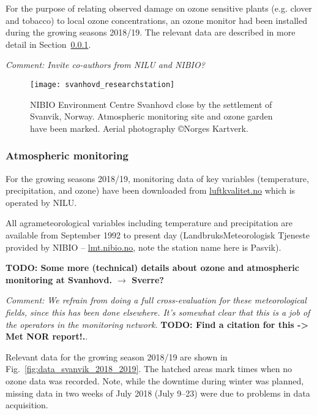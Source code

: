 \documentclass[bg, manuscript]{copernicus}
\begin{document}
For the purpose of relating observed damage on ozone sensitive plants (e.g. clover and tobacco) to local ozone concentrations, an ozone monitor had been installed during the growing seasons 2018/19. The relevant data are described in more detail in Section~\ref{subsubsec:atmo_svanvik}.

\emph{Comment: Invite co-authors from NILU and NIBIO?}

\begin{figure}[t]
  \texttt{[image: svanhovd\_researchstation]}
  \caption{NIBIO Environment Centre Svanhovd close by the settlement of Svanvik, Norway. Atmospheric monitoring site and ozone garden have been marked. Aerial photography \copyright Norges Kartverk.}
  \label{fig:svanhovd_research_station}
\end{figure}


\subsubsection{Atmospheric monitoring}
\label{subsubsec:atmo_svanvik}
For the growing seasons 2018/19, monitoring data of key variables (temperature, precipitation, and ozone) have been downloaded from \href{luftkvalitet.no}{luftkvalitet.no} which is operated by NILU.

All agrameteorological variables including temperature and precipitation are available from September 1992 to present day (LandbruksMeteorologisk Tjeneste provided by NIBIO -- \href{https://lmt.nibio.no/}{lmt.nibio.no}, note the station name here is Pasvik).

{\bf TODO: Some more (technical) details about ozone and atmospheric monitoring at Svanhovd. $\rightarrow$ Sverre?}

\emph{Comment: We refrain from doing a full cross-evaluation for these meteorological fields, since this has been done elsewhere. It's somewhat clear that this is a job of the operators in the monitoring network.} {\bf TODO: Find a citation for this -> Met NOR report!.}.

Relevant data for the growing season 2018/19 are shown in Fig.~\ref{fig:data_svanvik_2018_2019}. The hatched areas mark times when no ozone data was recorded. Note, while the downtime during winter was planned, missing data in two weeks of July 2018 (July 9--23) were due to problems in data acquisition.
\end{document}

